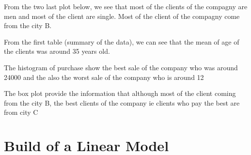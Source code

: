 \documentclass[11pt,a4paper]{article}
\begin{document}
From the two last plot below, we see that most of the clients of the compagny are men and most of the client are single.
Most of the client of the compagny come from the city B.

From the first table (summary of the data), we can see that the mean of age of the clients was around 35 years old. 

The histogram of purchase show the best sale of the company who was around 24000 and the also the worst sale of the company who is around 12

The box plot provide the information that although most of the client coming from the city B, the best clients of the company ie clients who pay the best are from city C 



 
\newpage
\section{Build of a Linear Model}

\begin{table}[ht]
	\caption{Correlation table between numerical variable}
	\centering
	
\end{table}
	
\end{document}
